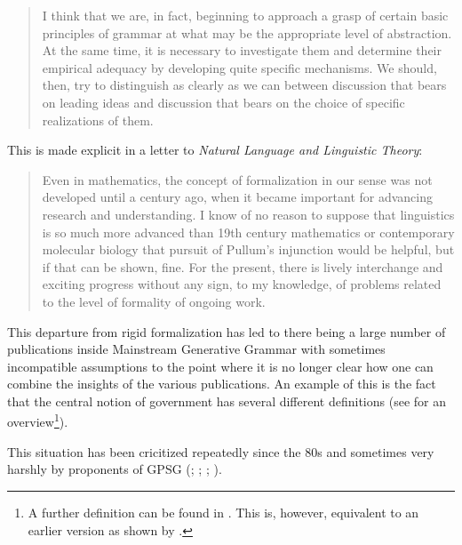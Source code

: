 \begin{quote}
I think that we are, in fact, beginning to approach a grasp of certain 
basic principles of grammar at what may be the appropriate level of abstraction. At the same time, 
it is necessary to investigate them and determine their empirical adequacy by developing quite specific mechanisms.
We should, then, try to distinguish as clearly as we can between discussion that bears on leading ideas and
discussion that bears on the choice of specific realizations of them. \citep*[--3]{Chomsky81a}
\end{quote}

This is made explicit in a letter to \emph{Natural Language and Linguistic Theory}:
\begin{quote}
Even in mathematics, the concept of formalization in our sense was not
developed until a century ago, when it became important for advancing research
and understanding. I know of no reason to suppose that linguistics is so much
more advanced than 19th century mathematics or contemporary molecular
biology that pursuit of Pullum's injunction would be helpful, but if that can be
shown, fine. For the present, there is lively interchange and exciting progress
without any sign, to my knowledge, of problems related to the level of formality
of ongoing work. \citep[]{Chomsky90a}
\end{quote}
This departure from rigid formalization has led to there being a large number of publications inside
Mainstream Generative Grammar with sometimes incompatible assumptions to the point where it is no longer clear
how one can combine the insights of the various publications. 
An example of this is the fact that the central notion of government has several different definitions
(see \citealp{AS83a} for an overview\footnote{%
A further definition can be found in . This is, however, equivalent to an earlier version as shown
by \citet[--106]{PP86a}.%
}).


This situation has been cricitized repeatedly since the 80s and sometimes very harshly by proponents of GPSG 
(\citealp*[]{GKPS85a}; \citealp{Pullum85a,Pullum89b}; \citealp[]{Pullum91b}; \citealp{KP90a}). 

